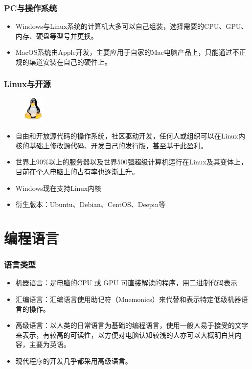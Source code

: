 \documentclass[10pt]{beamer}
\begin{document}
\begin{frame}
    \frametitle{PC与操作系统}

        \begin{itemize}
            \item Windows与Linux系统的计算机大多可以自己组装，选择需要的CPU、GPU、内存、硬盘等型号并更换。
            \item MacOS系统由Apple开发，主要应用于自家的Mac电脑产品上，只能通过不正规的渠道安装在自己的硬件上。
        \end{itemize}
\end{frame}

\begin{frame}
\frametitle{Linux与开源}
\begin{figure}
    \centering
    \includegraphics[width=0.1\textwidth]{figures/linux.jpeg}
\end{figure}

\begin{itemize}
    \item 自由和开放源代码的操作系统，社区驱动开发，任何人或组织可以在Linux内核的基础上修改源代码、开发自己的发行版，甚至基于此盈利。
    \item 世界上90\%以上的服务器以及世界500强超级计算机运行在Linux及其变体上，目前在个人电脑上的占有率也逐渐上升。
    \item Windows现在支持Linux内核
    \item 衍生版本：Ubuntu、Debian、CentOS、Deepin等
\end{itemize}
\end{frame}

\section{编程语言}


\begin{frame}
\frametitle{语言类型}

\begin{itemize}
    \item 机器语言：是电脑的CPU 或 GPU 可直接解读的程序，用二进制代码表示
    \item 汇编语言：汇编语言使用助记符（Mnemonics）来代替和表示特定低级机器语言的操作。
    \item 高级语言：以人类的日常语言为基础的编程语言，使用一般人易于接受的文字来表示，有较高的可读性，以方便对电脑认知较浅的人亦可以大概明白其内容，主要为英语。
    \item 现代程序的开发几乎都采用高级语言。
\end{itemize}
\end{frame}
\end{document}
